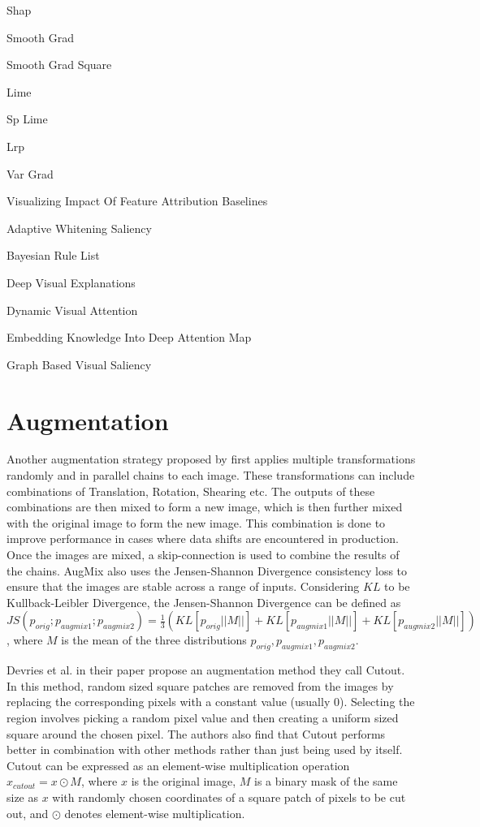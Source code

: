 Shap

Smooth Grad

Smooth Grad Square

Lime

Sp Lime

Lrp

Var Grad

Visualizing Impact Of Feature Attribution Baselines

Adaptive Whitening Saliency

Bayesian Rule List


Deep Visual Explanations

Dynamic Visual Attention

Embedding Knowledge Into Deep Attention Map

Graph Based Visual Saliency


\section{Augmentation} \label{sec:augmentation}
Another augmentation strategy proposed by \cite{hendrycksAugMixSimpleData2020} first applies multiple transformations randomly and in parallel chains to each image. These transformations can include combinations of Translation, Rotation, Shearing etc. The outputs of these combinations are then mixed to form a new image, which is then further mixed with the original image to form the new image. This combination is done to improve performance in cases where data shifts are encountered in production. Once the images are mixed, a skip-connection is used to combine the results of the chains. AugMix also uses the Jensen-Shannon Divergence consistency loss \cite{linDivergenceMeasuresBased} to ensure that the images are stable across a range of inputs. Considering $KL$ to be Kullback-Leibler Divergence, the Jensen-Shannon Divergence can be defined as $
    JS(p_{orig}; p_{augmix1};p_{augmix2}) = \frac{1}{3}(KL[p_{orig}||M||]+KL[p_{augmix1}||M||]+KL[p_{augmix2}||M||])
$, where $M$ is the mean of the three distributions $p_{orig}, p_{augmix1}, p_{augmix2}$.

Devries et al. in their paper \cite{devriesImprovedRegularizationConvolutional2017} propose an augmentation method they call Cutout. In this method, random sized square patches are removed from the images by replacing the corresponding pixels with a constant value (usually 0). Selecting the region involves picking a random pixel value and then creating a uniform sized square around the chosen pixel. The authors also find that Cutout performs better in combination with other methods rather than just being used by itself. Cutout can be expressed as an element-wise multiplication operation $x_{cutout} = x \odot M$,
where $x$ is the original image, $M$ is a binary mask of the same size as $x$ with randomly chosen coordinates of a square patch of pixels to be cut out, and $\odot$ denotes element-wise multiplication.

